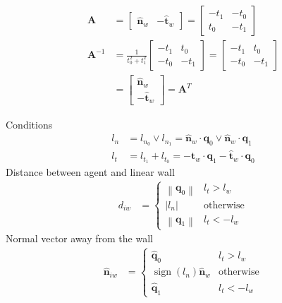 \begin{align}
\mathbf{A} 
&= \begin{bmatrix} \hat{\mathbf{n}}_{w} & -\hat{\mathbf{t}}_{w} \end{bmatrix} 
= \left[\begin{matrix}- t_{1} & - t_{0}\\t_{0} & - t_{1}\end{matrix}\right] \\
\mathbf{A}^{-1} 
&= \frac{1}{t_{0}^{2} + t_{1}^{2}} \left[\begin{matrix}- t_{1} & t_{0}\\- t_{0} & - t_{1}\end{matrix}\right]
= \left[\begin{matrix}- t_{1} & t_{0}\\- t_{0} & - t_{1}\end{matrix}\right] \\
&= \begin{bmatrix} \hat{\mathbf{n}}_{w} \\ -\hat{\mathbf{t}}_{w} \end{bmatrix} = \mathbf{A}^{T}
\end{align}

Conditions
\begin{align}
l_{n} &= l_ {n_0} \vee l_{n_1} = \hat{\mathbf{n}}_{w} \cdot \mathbf{q}_{0} \vee \hat{\mathbf{n}}_{w} \cdot \mathbf{q}_{1} \\
l_{t} &= l_{t_1} + l_{t_0} = - \hat{\mathbf{t}}_{w} \cdot \mathbf{q}_{1} - \hat{\mathbf{t}}_{w} \cdot \mathbf{q}_{0}
\end{align}
Distance between agent and linear wall
\begin{align}
d_{iw} &=
\begin{cases}
\left\|\mathbf{q}_{0}\right\| & l_{t} > l_{w} \\
\left|l_{n}\right| & \text{otherwise} \\
\left\|\mathbf{q}_{1}\right\| & l_{t} < -l_{w}
\end{cases}
\end{align}
Normal vector away from the wall
\begin{align}
\hat{\mathbf{n}}_{iw} &=
\begin{cases}
\hat{\mathbf{q}}_{0} & l_{t} > l_{w} \\
\operatorname{sign}(l_{n})\hat{\mathbf{n}}_{w} & \text{otherwise} \\
\hat{\mathbf{q}}_{1} & l_{t} < -l_{w}
\end{cases}
\end{align}


